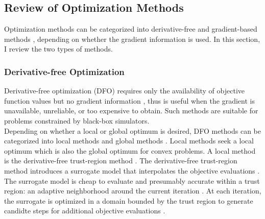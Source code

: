 \subsection{Review of Optimization Methods}
\label{sec: review optimization}
Optimization methods can be categorized into derivative-free and gradient-based methods 
\cite{gradfreereview}, depending on whether the gradient information is used. 
In this section, I review the two types of methods.\\
\subsubsection{Derivative-free Optimization}
\label{section: DFO}
Derivative-free optimization (DFO) requires only the availability of objective
function values but no gradient information \cite{gradfreereview}, thus is useful when the gradient
is unavailable, unreliable, or too expensive to obtain. 
Such methods are suitable for problems constrained by black-box simulators.\\

Depending on whether a local or global optimum is desired,
DFO methods can be categorized into local methods and global methods \cite{gradfreereview}.
Local methods seek a local optimum which is also the global optimum for convex problems. 
A local method is the derivative-free
trust-region method \cite{trust region grad free review}.
The derivative-free trust-region method introduces a surrogate model that interpolates the
objective evaluations \cite{linear trust region, trustregionwild}.
The surrogate model is cheap to evaluate and presumably accurate within a trust region: 
an adaptive neighborhood around the current iteration \cite{trust region review, 
trust region grad free review}. 
At each iteration, the surrogate is optimized in a domain bounded by the trust region to generate
candidte steps for additional objective evaluations \cite{trust region review, 
trust region grad free review}.\\

